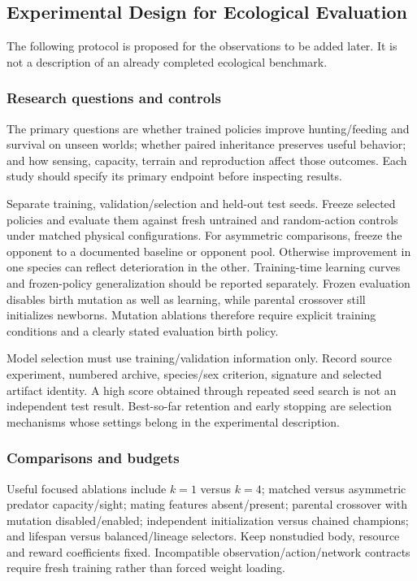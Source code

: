 \subsection{Experimental Design for Ecological Evaluation}\label{sec:protocol}
The following protocol is proposed for the observations to be added later.
It is not a description of an already completed ecological benchmark.

\subsubsection{Research questions and controls}
The primary questions are whether trained policies improve hunting/feeding and
survival on unseen worlds; whether paired inheritance preserves useful behavior;
and how sensing, capacity, terrain and reproduction affect those outcomes.
Each study should specify its primary endpoint before inspecting results.

Separate training, validation/selection and held-out test seeds. Freeze selected
policies and evaluate them against fresh untrained and random-action controls
under matched physical configurations. For asymmetric comparisons, freeze the
opponent to a documented baseline or opponent pool. Otherwise improvement in
one species can reflect deterioration in the other. Training-time learning curves
and frozen-policy generalization should be reported separately.
Frozen evaluation disables birth mutation as well as learning, while parental
crossover still initializes newborns. Mutation ablations therefore require
explicit training conditions and a clearly stated evaluation birth policy.

Model selection must use training/validation information only. Record source
experiment, numbered archive, species/sex criterion, signature and selected
artifact identity. A high score obtained through repeated seed search is not an
independent test result. Best-so-far retention and early stopping are selection
mechanisms whose settings belong in the experimental description.

\subsubsection{Comparisons and budgets}
Useful focused ablations include $k=1$ versus $k=4$; matched versus asymmetric
predator capacity/sight; mating features absent/present; parental crossover
with mutation disabled/enabled; independent initialization versus chained
champions; and lifespan versus balanced/lineage selectors. Keep nonstudied body,
resource and reward coefficients fixed. Incompatible observation/action/network
contracts require fresh training rather than forced weight loading.

